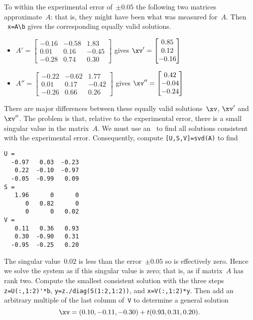 \begin{example}
\begin{solution}
To within the experimental error of~\(\pm0.05\) the following two matrices approximate~\(A\): that is, they might have been what was measured for~\(A\).
Then \script\ \verb|x=A\b| gives the corresponding equally valid solutions.
\begin{itemize}
\item \(A'=\begin{bmatrix} -0.16&-0.58&1.83
\\ 0.01&0.16&-0.45
\\ -0.28&0.74&0.30 \end{bmatrix}\) gives
\(\xv'=\begin{bmatrix} 0.85\\0.12\\-0.16 \end{bmatrix}\)
\item \(A''=\begin{bmatrix} -0.22&-0.62&1.77
\\ 0.01&0.17&-0.42
\\ -0.26&0.66&0.26 \end{bmatrix}\) gives
\(\xv''=\begin{bmatrix} 0.42\\-0.04\\-0.24 \end{bmatrix}\)
\end{itemize}
There are major differences between these equally valid solutions~\(\xv\), \(\xv'\) and~\(\xv''\).
The problem is that, relative to the experimental error, there is a small singular value in the matrix~\(A\).
We must use an \svd\ to find all solutions consistent with the experimental error. 
Consequently, compute \verb|[U,S,V]=svd(A)| to find \twodp
\begin{verbatim}
U =
  -0.97   0.03  -0.23
   0.22  -0.10  -0.97
  -0.05  -0.99   0.09
S =
   1.96      0      0
      0   0.82      0
      0      0   0.02
V =
   0.11   0.36   0.93
   0.30  -0.90   0.31
  -0.95  -0.25   0.20
\end{verbatim}
The singular value~\(0.02\) is less than the error~\(\pm0.05\) so is effectively zero.
Hence we solve the system as if this singular value is zero; that is, as if matrix~\(A\) has rank two.
Compute the smallest consistent solution with the three steps \verb|z=U(:,1:2)'*b|, \verb|y=z./diag(S(1:2,1:2))|, and \verb|x=V(:,1:2)*y|.
Then add an arbitrary multiple of the last column of~\verb|V| to determine a general solution 
\begin{equation*}
\xv=(0.10,-0.11,-0.30)+t(0.93,0.31,0.20).
\end{equation*}
\end{solution}
\end{example}


